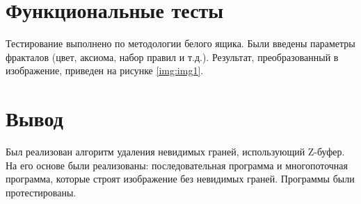 \section{Функциональные тесты}

Тестирование выполнено по методологии белого ящика. Были введены параметры фракталов (цвет, аксиома, набор правил и т.д.). Результат, преобразованный в изображение, приведен на рисунке \ref{img:img1}.

\newpage
{}

\section*{Вывод}

Был реализован алгоритм удаления невидимых граней, использующий Z-буфер. На его основе были реализованы: последовательная программа и многопоточная программа, которые строят изображение без невидимых граней. Программы были протестированы.
